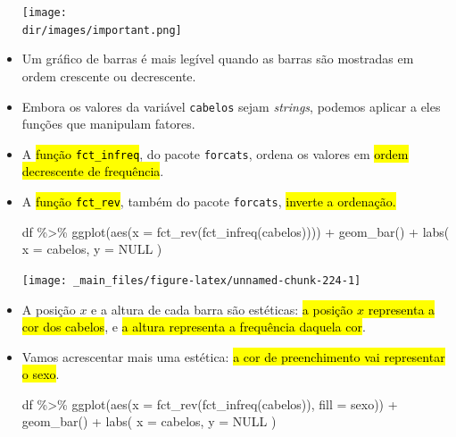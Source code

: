 \documentclass[
  11pt]{report}
\newenvironment{Shaded}{\begin{snugshade}}{\end{snugshade}}
\newcommand{\AttributeTok}[1]{\textcolor[rgb]{0.77,0.63,0.00}{#1}}
\newcommand{\ConstantTok}[1]{\textcolor[rgb]{0.00,0.00,0.00}{#1}}
\newcommand{\FunctionTok}[1]{\textcolor[rgb]{0.00,0.00,0.00}{#1}}
\newcommand{\NormalTok}[1]{#1}
\newcommand{\SpecialCharTok}[1]{\textcolor[rgb]{0.00,0.00,0.00}{#1}}
\newcommand{\StringTok}[1]{\textcolor[rgb]{0.31,0.60,0.02}{#1}}
\newcommand{\dir}{/ssd/R/x86_64-pc-linux-gnu-library/4.3/fnaufelRmd/rmarkdown/resources}
\newenvironment{rmdimportant}
{
  \begin{myimportant}
    \texttt{[image: \\dir/images/important.png]}
    \tcblower
  }
  {
  \end{myimportant}
}
\renewenvironment{Shaded}{
    \begin{mdframed}[%
      roundcorner=2pt,%
      innerleftmargin=5pt,%
      innerrightmargin=5pt,%
      topline=true,%
      leftline=true,%
      rightline=true,%
      bottomline=true,%
      linewidth=0.5pt,%
      linecolor=black!20,%
      backgroundcolor=black!2,%
      skipabove=2ex,%
      skipbelow=2.5ex%
    ]%
  }
  {
    \end{mdframed}
  }
\begin{document}
\begin{itemize}
\begin{rmdimportant}
  \end{rmdimportant}
\item
  Um gráfico de barras é mais legível quando as barras são mostradas em ordem crescente ou decrescente.
\item
  Embora os valores da variável \texttt{cabelos} sejam \emph{strings}, podemos aplicar a eles funções que manipulam fatores.
\item
  A {\hl{função {\mbox{\texttt{fct\_infreq}}}}}, do pacote \texttt{forcats}, ordena os valores em {\hl{ordem decrescente de frequência}}.
\item
  A {\hl{função {\mbox{\texttt{fct\_rev}}}}}, também do pacote \texttt{forcats}, {\hl{inverte a ordenação.}}

\begin{Shaded}
\begin{Highlighting}[]
\NormalTok{df }\SpecialCharTok{\%\textgreater{}\%} 
  \FunctionTok{ggplot}\NormalTok{(}\FunctionTok{aes}\NormalTok{(}\AttributeTok{x =} \FunctionTok{fct\_rev}\NormalTok{(}\FunctionTok{fct\_infreq}\NormalTok{(cabelos)))) }\SpecialCharTok{+}
    \FunctionTok{geom\_bar}\NormalTok{() }\SpecialCharTok{+}
    \FunctionTok{labs}\NormalTok{(}
      \AttributeTok{x =} \StringTok{\textquotesingle{}cabelos\textquotesingle{}}\NormalTok{,}
      \AttributeTok{y =} \ConstantTok{NULL}
\NormalTok{    )}
\end{Highlighting}
\end{Shaded}

  \begin{center}\texttt{[image: \_main\_files/figure-latex/unnamed-chunk-224-1]} \end{center}
\item
  A posição $x$ e a altura de cada barra são estéticas: {\hl{a posição $x$ representa a cor dos cabelos}}, e {\hl{a altura representa a frequência daquela cor}}.
\item
  Vamos acrescentar mais uma estética: {\hl{a cor de preenchimento vai representar o sexo}}.

\begin{Shaded}
\begin{Highlighting}[]
\NormalTok{df }\SpecialCharTok{\%\textgreater{}\%} 
  \FunctionTok{ggplot}\NormalTok{(}\FunctionTok{aes}\NormalTok{(}\AttributeTok{x =} \FunctionTok{fct\_rev}\NormalTok{(}\FunctionTok{fct\_infreq}\NormalTok{(cabelos)), }\AttributeTok{fill =}\NormalTok{ sexo)) }\SpecialCharTok{+}
    \FunctionTok{geom\_bar}\NormalTok{() }\SpecialCharTok{+}
    \FunctionTok{labs}\NormalTok{(}
      \AttributeTok{x =} \StringTok{\textquotesingle{}cabelos\textquotesingle{}}\NormalTok{,}
      \AttributeTok{y =} \ConstantTok{NULL}
\NormalTok{    )}
\end{Highlighting}
\end{Shaded}


\end{itemize}
\end{document}
